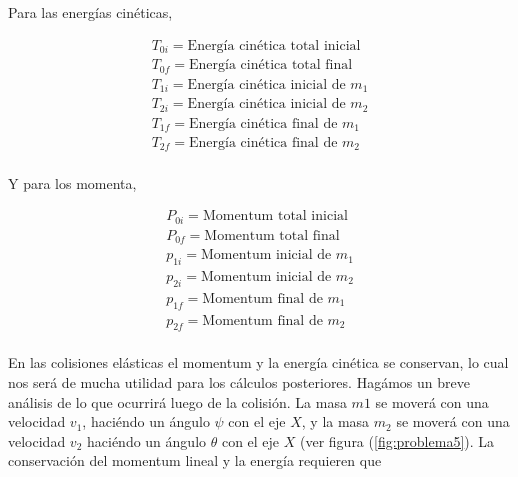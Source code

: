 \documentclass[a4paper,10pt]{article}
\numberwithin{equation}{section}
\begin{document}
Para las energías cinéticas,
 
 \begin{gather*}
  T_{0i} = \textrm{Energía cinética total inicial} \\
%
  T_{0f} = \textrm{Energía cinética total final} \\
%  
%  
   T_{1i} = \textrm{Energía cinética inicial de } m_1 \\
%   
   T_{2i} = \textrm{Energía cinética inicial de } m_2 \\
%  
  T_{1f} = \textrm{Energía cinética final de } m_1 \\
%  
  T_{2f} = \textrm{Energía cinética final de } m_2 \\
%
\label{eq:energiasCineticas}
  \end{gather*}
  
Y para los momenta,

 \begin{gather*}
  P_{0i} = \textrm{Momentum total inicial} \\
  P_{0f} = \textrm{Momentum total final} \\
%  
   p_{1i} = \textrm{Momentum inicial de } m_1 \\
%   
   p_{2i} = \textrm{Momentum inicial de } m_2 \\
%  
  p_{1f} = \textrm{Momentum final de } m_1 \\
%  
  p_{2f} = \textrm{Momentum final de } m_2 \\
%
\label{eq:Momenta}
  \end{gather*}
  
En las colisiones elásticas el momentum y la energía cinética se conservan, lo cual nos 
será de mucha utilidad para los cálculos posteriores. Hagámos un breve análisis de lo 
que ocurrirá luego de la colisión. La masa $m1$ se moverá con una velocidad $v_1$,
haciéndo un ángulo $\psi$ con el eje $X$, y la masa $m_2$ se moverá con una 
velocidad $v_2$ haciéndo un ángulo $\theta$ con el eje $X$ (ver figura (\ref{fig:problema5}). La conservación 
del momentum lineal y la energía requieren que 
\end{document}
